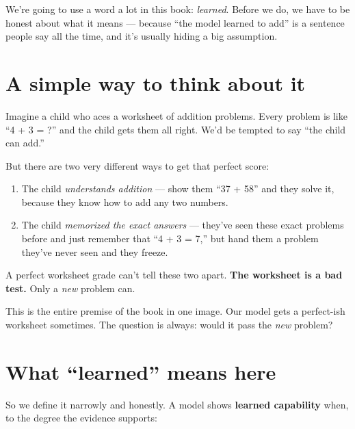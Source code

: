 We're going to use a word a lot in this book: \emph{learned}. Before we
do, we have to be honest about what it means --- because ``the model
learned to add'' is a sentence people say all the time, and it's usually
hiding a big assumption.

\section{A simple way to think about
it}\label{a-simple-way-to-think-about-it}

Imagine a child who aces a worksheet of addition problems. Every problem
is like ``4 + 3 = ?'' and the child gets them all right. We'd be tempted
to say ``the child can add.''

But there are two very different ways to get that perfect score:

\begin{enumerate}
\def\labelenumi{\arabic{enumi}.}
\tightlist
\item
  The child \emph{understands addition} --- show them ``37 + 58'' and
  they solve it, because they know how to add any two numbers.
\item
  The child \emph{memorized the exact answers} --- they've seen these
  exact problems before and just remember that ``4 + 3 = 7,'' but hand
  them a problem they've never seen and they freeze.
\end{enumerate}

A perfect worksheet grade can't tell these two apart. \textbf{The
worksheet is a bad test.} Only a \emph{new} problem can.

This is the entire premise of the book in one image. Our model gets a
perfect-ish worksheet sometimes. The question is always: would it pass
the \emph{new} problem?

\section{What ``learned'' means here}\label{what-learned-means-here}

So we define it narrowly and honestly. A model shows \textbf{learned
capability} when, to the degree the evidence supports:

